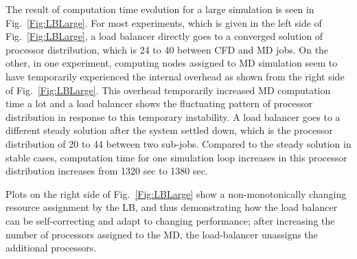 \documentclass[conference,final]{IEEEtran}
\begin{document}
The result of computation time evolution for a large simulation is seen in Fig.~\ref{Fig:LBLarge}. For most experiments, which is given in the left side of Fig.~\ref{Fig:LBLarge}, a load balancer directly goes to a converged solution of processor distribution, which is 24 to 40 between CFD and MD jobs. On the other, in one experiment, computing nodes assigned to MD simulation seem to have temporarily experienced the internal overhead as shown from the right side of Fig.~\ref{Fig:LBLarge}. This overhead temporarily increased MD computation time a lot and a load balancer shows the fluctuating pattern of processor distribution in response to this temporary instability. A load balancer goes to a different steady solution after the system settled down, which is the processor distribution of 20 to 44 between two sub-jobs. Compared to the steady solution in stable cases, computation time for one simulation loop increases in this processor distribution increases from 1320 sec to 1380 sec.

Plots on the right side of Fig.~\ref{Fig:LBLarge} show a non-monotonically changing resource assignment by the LB, and thus demonstrating how the load balancer can be self-correcting and adapt to changing performance; after increasing the number of processors assigned to the MD, the load-balancer unassigns the additional processors.
\end{document}
